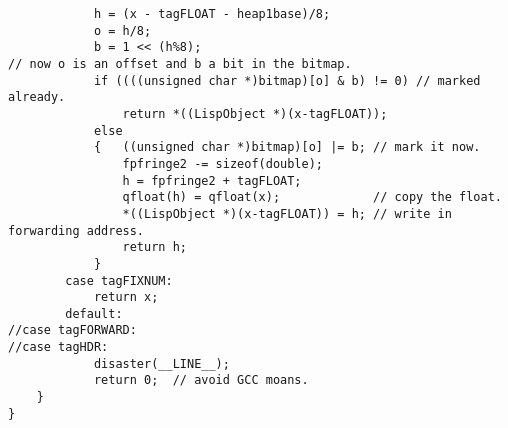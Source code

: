 {\begin{verbatim}
            h = (x - tagFLOAT - heap1base)/8;
            o = h/8;
            b = 1 << (h%8);
// now o is an offset and b a bit in the bitmap.
            if ((((unsigned char *)bitmap)[o] & b) != 0) // marked already.
                return *((LispObject *)(x-tagFLOAT));
            else
            {   ((unsigned char *)bitmap)[o] |= b; // mark it now.
                fpfringe2 -= sizeof(double);
                h = fpfringe2 + tagFLOAT;
                qfloat(h) = qfloat(x);             // copy the float.
                *((LispObject *)(x-tagFLOAT)) = h; // write in forwarding address.
                return h;
            }
        case tagFIXNUM:
            return x;
        default:
//case tagFORWARD:
//case tagHDR:
            disaster(__LINE__);
            return 0;  // avoid GCC moans.
    }
}

\end{verbatim}}
